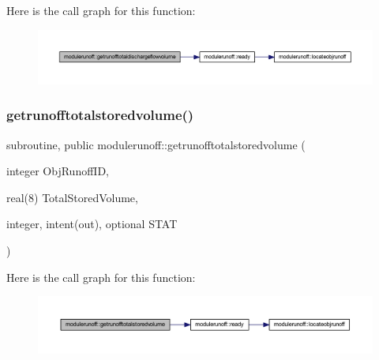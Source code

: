 Here is the call graph for this function\+:\nopagebreak
\begin{figure}[H]
\begin{center}
\leavevmode
\includegraphics[width=350pt]{namespacemodulerunoff_aa4377dd8080b614590e0609f019f9764_cgraph}
\end{center}
\end{figure}
\mbox{\label{namespacemodulerunoff_aa890e5ad105516c116e7c4f53b656bfb}} 
\subsubsection{\texorpdfstring{getrunofftotalstoredvolume()}{getrunofftotalstoredvolume()}}
{\footnotesize\ttfamily subroutine, public modulerunoff\+::getrunofftotalstoredvolume (\begin{DoxyParamCaption}\item[{integer}]{Obj\+Runoff\+ID,  }\item[{real(8)}]{Total\+Stored\+Volume,  }\item[{integer, intent(out), optional}]{S\+T\+AT }\end{DoxyParamCaption})}

Here is the call graph for this function\+:\nopagebreak
\begin{figure}[H]
\begin{center}
\leavevmode
\includegraphics[width=350pt]{namespacemodulerunoff_aa890e5ad105516c116e7c4f53b656bfb_cgraph}
\end{center}
\end{figure}
\mbox{\label{namespacemodulerunoff_a2f62616fa000a8f027d3557454de9b24}} 
